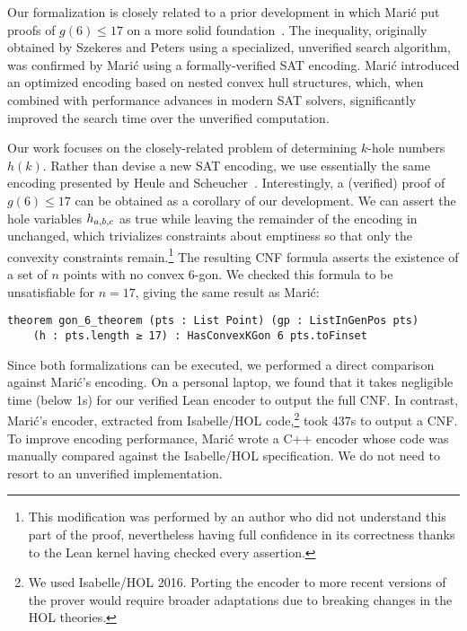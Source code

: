Our formalization is closely related to a prior development
in which Marić put proofs of $g(6) \leq 17$ on a more solid foundation~\cite{19maric_fast_formal_proof_erdos_szekeres_conjecture_convex_polygons_most_six_points}.
The inequality,
originally obtained by Szekeres and Peters \cite{06szekeres_computer_solution_17_point_erdos_szekeres_problem}
using a specialized, unverified search algorithm,
was confirmed by Marić using a formally-verified SAT encoding.
Marić introduced an optimized encoding based on nested convex hull structures,
which, when combined with performance advances in modern SAT solvers,
significantly improved the search time over the unverified computation.

Our work focuses on the closely-related problem
of determining $k$-hole numbers $h(k)$.
Rather than devise a new SAT encoding,
we use essentially the same encoding presented by Heule and Scheucher~\cite{emptyHexagonNumber}.
Interestingly,
a (verified) proof of $g(6) \leq 17$ can be obtained
as a corollary of our development.
We can assert the hole variables $\hvar_{a,b,c}$ as true
while leaving the remainder of the encoding in~ unchanged,
which trivializes constraints about emptiness
so that only the convexity constraints remain.\footnote{
This modification was performed by an author
who did not understand this part of the proof,
nevertheless having full confidence in its correctness
thanks to the Lean kernel having checked every assertion.}
The resulting CNF formula
asserts the existence of a set of $n$ points
with no convex $6$-gon.
We checked this formula to be unsatisfiable for $n = 17$,
giving the same result as Marić:
\begin{lstlisting}
theorem gon_6_theorem (pts : List Point) (gp : ListInGenPos pts)
    (h : pts.length ≥ 17) : HasConvexKGon 6 pts.toFinset
\end{lstlisting}

Since both formalizations can be executed,
we performed a direct comparison against Marić's encoding.
On a personal laptop,
we found that it takes negligible time (below 1s)
for our verified Lean encoder to output the full CNF.
In contrast,
Marić's encoder, extracted from Isabelle/HOL code,\footnote{
  We used Isabelle/HOL 2016.
  Porting the encoder to more recent versions of the prover
  would require broader adaptations
  due to breaking changes in the HOL theories.}
took 437s to output a CNF.
To improve encoding performance,
Marić wrote a C++ encoder
whose code was manually compared against the Isabelle/HOL specification.
We do not need to resort to an unverified implementation.

